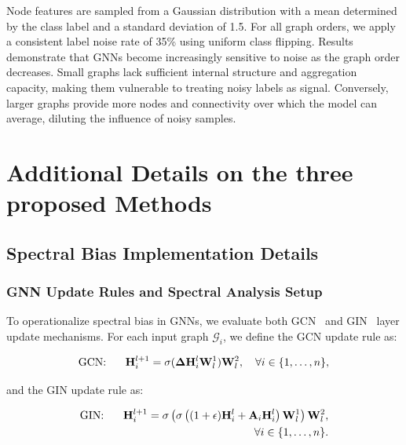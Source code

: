 {Node features are sampled from a Gaussian distribution with a mean determined by the class label and a standard deviation of 1.5. For all graph orders, we apply a consistent label noise rate of 35\% using uniform class flipping. Results demonstrate that GNNs become increasingly sensitive to noise as the graph order decreases. Small graphs lack sufficient internal structure and aggregation capacity, making them vulnerable to treating noisy labels as signal. Conversely, larger graphs provide more nodes and connectivity over which the model can average, diluting the influence of noisy samples.



\section{Additional Details on the three proposed Methods}


\subsection{Spectral Bias Implementation Details}
\label{app: weightmatrice_eigens}
\subsubsection{GNN Update Rules and Spectral Analysis Setup}

To operationalize spectral bias in GNNs, we evaluate both GCN~\cite{gcn} and GIN~\cite{WL1} layer update mechanisms. For each input graph $\mathcal{G}_i$, we define the GCN update rule as:

\begin{equation}
    \text{GCN: \hspace{0.5cm}}
    \mathbf{H}_i^{l+1} = \sigma(\mathbf{\Delta} \mathbf{H}_i^l \mathbf{W}^1_l)\mathbf{W}^2_l, \quad \forall i \in \{1, \ldots, n\},
\end{equation}

and the GIN update rule as:

\begin{equation}
\begin{aligned}
    \text{GIN: \hspace{0.5cm}} \mathbf{H}_i^{l+1} = \sigma\left( \sigma\left((1 + \epsilon)\mathbf{H}_i^l + \mathbf{A}_i \mathbf{H}_i^l \right) \mathbf{W}_l^1 \right) \mathbf{W}_l^2, \\
    \forall i \in \{1, \ldots, n\}.
\end{aligned}
\end{equation}

}
